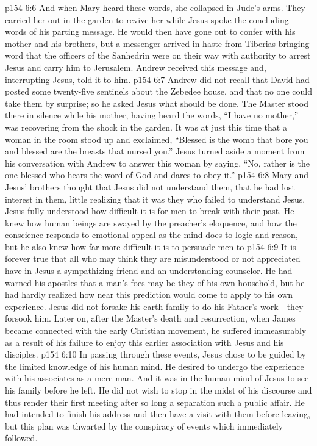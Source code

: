 \vs p154 6:6 And when Mary heard these words, she collapsed in Jude’s arms. They carried her out in the garden to revive her while Jesus spoke the concluding words of his parting message. He would then have gone out to confer with his mother and his brothers, but a messenger arrived in haste from Tiberias bringing word that the officers of the Sanhedrin were on their way with authority to arrest Jesus and carry him to Jerusalem. Andrew received this message and, interrupting Jesus, told it to him.
\vs p154 6:7 Andrew did not recall that David had posted some twenty\hyp{}five sentinels about the Zebedee house, and that no one could take them by surprise; so he asked Jesus what should be done. The Master stood there in silence while his mother, having heard the words, \textcolor{ubdarkred}{“I have no mother,”} was recovering from the shock in the garden. It was at just this time that a woman in the room stood up and exclaimed, “Blessed is the womb that bore you and blessed are the breasts that nursed you.” Jesus turned aside a moment from his conversation with Andrew to answer this woman by saying, \textcolor{ubdarkred}{“No, rather is the one blessed who hears the word of God and dares to obey it.”}
\pc \vs p154 6:8 Mary and Jesus’ brothers thought that Jesus did not understand them, that he had lost interest in them, little realizing that it was they who failed to understand Jesus. Jesus fully understood how difficult it is for men to break with their past. He knew how human beings are swayed by the preacher’s eloquence, and how the conscience responds to emotional appeal as the mind does to logic and reason, but he also knew how far more difficult it is to persuade men to 
\vs p154 6:9 It is forever true that all who may think they are misunderstood or not appreciated have in Jesus a sympathizing friend and an understanding counselor. He had warned his apostles that a man’s foes may be they of his own household, but he had hardly realized how near this prediction would come to apply to his own experience. Jesus did not forsake his earth family to do his Father’s work---they forsook him. Later on, after the Master’s death and resurrection, when James became connected with the early Christian movement, he suffered immeasurably as a result of his failure to enjoy this earlier association with Jesus and his disciples.
\pc \vs p154 6:10 In passing through these events, Jesus chose to be guided by the limited knowledge of his human mind. He desired to undergo the experience with his associates as a mere man. And it was in the human mind of Jesus to see his family before he left. He did not wish to stop in the midst of his discourse and thus render their first meeting after so long a separation such a public affair. He had intended to finish his address and then have a visit with them before leaving, but this plan was thwarted by the conspiracy of events which immediately followed.

